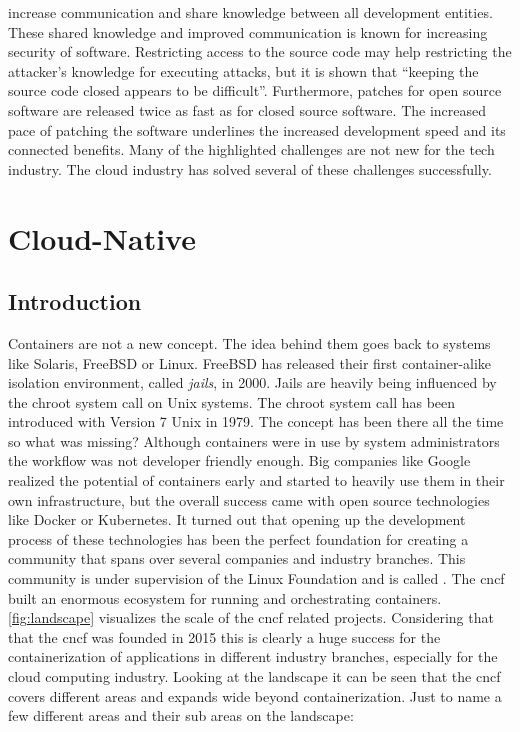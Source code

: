 \documentclass[titlepage]{report}
\begin{document}
increase communication and share knowledge between all development entities. These shared knowledge and improved communication is known for increasing
security of software\cite{hoepman2007increased}. Restricting access to the source code may help restricting the attacker's knowledge for executing attacks, but it is shown that
``keeping the source code closed appears to be difficult''\cite{mercuri2003security}. Furthermore, patches for open source software are released twice as fast
as for closed source software\cite{witten2001does}. The increased pace of patching the software underlines the increased development speed and its connected
benefits. Many of the highlighted challenges are not new for the tech industry. The cloud industry has solved several of these challenges successfully.

\chapter{Cloud-Native}\label{chapter:cloud_native}
\section{Introduction}
Containers are not a new concept. The idea behind them goes back to systems like Solaris, FreeBSD or Linux. FreeBSD has released their first container-alike
isolation environment, called \emph{jails}, in 2000\cite{FreeBSD4Announcement}. Jails are heavily being influenced by the chroot system call on Unix systems.
The chroot system call has been introduced with Version 7 Unix in 1979\cite{BYTE}. The concept has been there all the time so what was missing?
Although containers were in use by system administrators the workflow was not developer friendly enough. Big companies like Google
realized the potential of containers early and started to heavily use them in their own infrastructure, but the overall success
came with open source technologies like Docker or Kubernetes. It turned out that opening up the development process of these technologies
has been the perfect foundation for creating a community that spans over several companies and industry branches. This community is under
supervision of the Linux Foundation and is called \cite{CNCFFounding}. The \gls{cncf} built an enormous ecosystem for
running and orchestrating containers. \autoref{fig:landscape} visualizes the scale of the \gls{cncf} related projects\cite{CNCFLandscape}. Considering that
that the \gls{cncf} was founded in 2015 this is clearly a huge success for the containerization of applications in different industry branches, especially
for the cloud computing industry. Looking at the landscape it can be seen that the \gls{cncf} covers different areas and expands wide beyond containerization.
Just to name a few different areas and their sub areas on the landscape:
\end{document}
